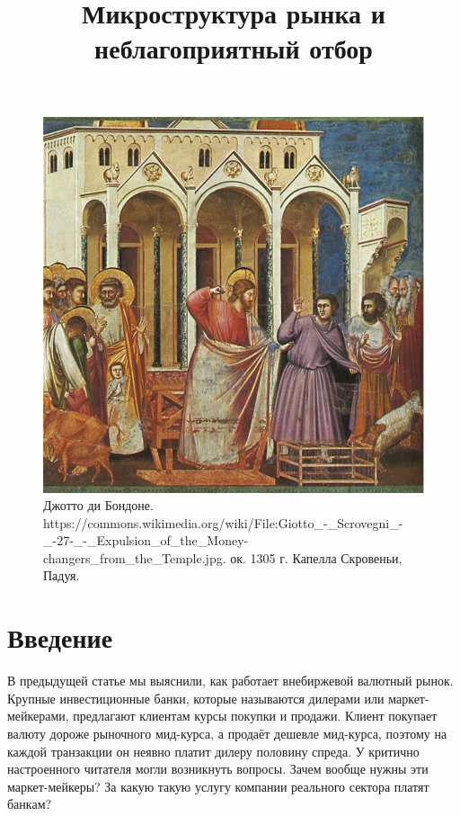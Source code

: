 
\title{Микроструктура рынка и неблагоприятный отбор}



\maketitle
\thispagestyle{empty}

\begin{figure}[h]
\centering
\includegraphics[scale=0.6314]{temple.jpg}
\captionsetup{labelformat=empty}
\caption{\small{
Джотто ди Бондоне. 
{https://commons.wikimedia.org/wiki/File:Giotto_-_Scrovegni_-_-27-_-_Expulsion_of_the_Money-changers_from_the_Temple.jpg}.
ок. 1305 г. Капелла Скровеньи, Падуя.
}}
\end{figure}
\newpage

\section*{Введение}

В предыдущей статье мы выяснили, как работает внебиржевой валютный рынок.
Крупные инвестиционные банки, которые называются дилерами или маркет-мейкерами,
предлагают клиентам курсы покупки и продажи. Клиент покупает валюту дороже
рыночного мид-курса, а продаёт дешевле мид-курса, поэтому на каждой транзакции
он неявно платит дилеру половину спреда. У критично настроенного читателя могли
возникнуть вопросы. Зачем вообще нужны эти маркет-мейкеры? За какую такую услугу
компании реального сектора платят банкам?

